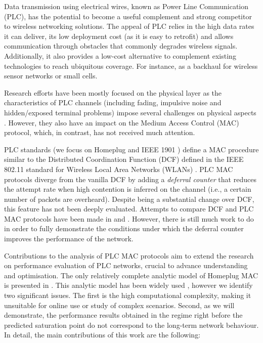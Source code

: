 \documentclass[preprint,12pt]{elsarticle}
\begin{document}
Data transmission using electrical wires, known as Power Line Communication (PLC), has the potential to become a useful complement and strong competitor to wireless networking solutions. The appeal of PLC relies in the high data rates it can deliver, its low deployment cost (as it is easy to retrofit) and allows communication through obstacles that commonly degrades wireless signals. Additionally, it also provides a low-cost alternative to complement existing technologies to reach ubiquitous coverage. For instance, as a backhaul for wireless sensor networks or small cells.

Research efforts have been mostly focused on the physical layer as the characteristics of PLC channels (including fading, impulsive noise and hidden/exposed terminal problems) impose several challenges on physical aspects \cite{ferreira1999power}. However, they also have an impact on the Medium Access Control (MAC) protocol, which, in contrast, has not received much attention. 
 


PLC standards (we focus on Homeplug \cite{HomeplugStd} and IEEE 1901 \cite{IEEE1901}) define a MAC procedure similar to the Distributed Coordination Function (DCF) defined in the IEEE 802.11 standard for Wireless Local Area Networks (WLANs) \cite{IEEE80211-IEEESTD1999}. PLC MAC protocols diverge from the vanilla DCF by adding a \emph{deferral counter} that reduces the attempt rate when high contention is inferred on the channel (i.e., a certain number of packets are overheard). Despite being a substantial change over DCF, this feature has not been deeply evaluated. Attempts to compare DCF and PLC MAC protocols have been made in \cite{Velloso,Li2011,vlachou2013fairness} and \cite{cano2013pimrc}. However, there is still much work to do in order to fully demonstrate the conditions under which the deferral counter improves the performance of the network.



Contributions to the analysis of PLC MAC protocols aim to extend the research on performance evaluation of PLC networks, crucial to advance understanding and optimisation. The only relatively complete analytic model of Homeplug MAC is presented in \cite{chung2006performance}. This analytic model has been widely used \cite{yoon2008adaptive,koutny2011homeplug,pinero2011homeplug,koutny2013analysis,pinero2011realistic,yoon2013multichannel}, however we identify two significant issues. The first is the high computational complexity, making it unsuitable for online use or study of complex scenarios. Second, as we will demonstrate, the performance results obtained in the regime right before the predicted saturation point do not correspond to the long-term network behaviour. In detail, the main contributions of this work are the following:
\end{document}
